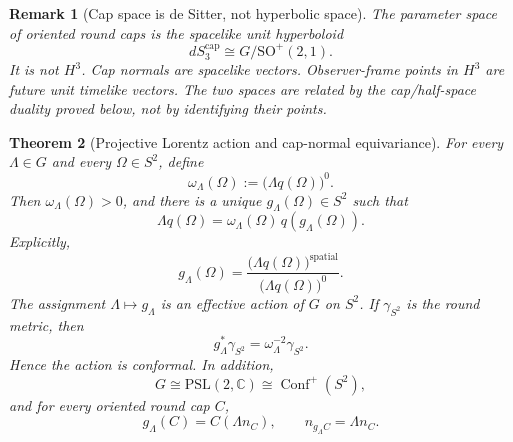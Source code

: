 \documentclass[11pt]{article}
\newtheorem{theorem}{Theorem}[section]
\newtheorem{remark}[theorem]{Remark}
\begin{document}
\begin{remark}[Cap space is de Sitter, not hyperbolic space]
\label{rem:cap-ds-not-h3}
The parameter space of oriented round caps is the spacelike unit hyperboloid
\[
dS_3^{\mathrm{cap}}\cong G/\mathrm{SO}^{+}(2,1).
\]
It is not \(H^3\). Cap normals are spacelike vectors. Observer-frame points
in \(H^3\) are future unit timelike vectors. The two spaces are related by
the cap/half-space duality proved below, not by identifying their points.
\end{remark}

\begin{theorem}[Projective Lorentz action and cap-normal equivariance]
\label{thm:cap-normal-equivariance}
For every \(\Lambda\in G\) and every \(\Omega\in S^2\), define
\[
\omega_\Lambda(\Omega):=\bigl(\Lambda q(\Omega)\bigr)^0.
\]
Then \(\omega_\Lambda(\Omega)>0\), and there is a unique
\(g_\Lambda(\Omega)\in S^2\) such that
\[
\boxed{
\Lambda q(\Omega)=\omega_\Lambda(\Omega)\,
q\!\left(g_\Lambda(\Omega)\right).
}
\]
Explicitly,
\[
\boxed{
g_\Lambda(\Omega)=
\frac{\bigl(\Lambda q(\Omega)\bigr)^{\mathrm{spatial}}}
{\bigl(\Lambda q(\Omega)\bigr)^0}.
}
\]
The assignment \(\Lambda\mapsto g_\Lambda\) is an effective action of \(G\)
on \(S^2\). If \(\gamma_{S^2}\) is the round metric, then
\[
\boxed{
g_\Lambda^*\gamma_{S^2}=\omega_\Lambda^{-2}\gamma_{S^2}.
}
\]
Hence the action is conformal. In addition,
\[
G\cong \mathrm{PSL}(2,\mathbb C)\cong\operatorname{Conf}^{+}(S^2),
\]
and for every oriented round cap \(C\),
\[
\boxed{
g_\Lambda(C)=C(\Lambda n_C),
\qquad
n_{g_\Lambda C}=\Lambda n_C.
}
\]
\end{theorem}
\end{document}
